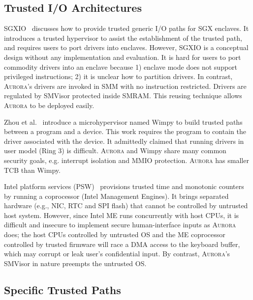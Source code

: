 \documentclass[journal,twocolumn,letterpaper,10pt]{IEEEtran}
\begin{document}
\subsection{Trusted I/O Architectures}

SGXIO~\cite{weiser_sgxio:_2017} discusses how to provide trusted generic I/O paths for SGX enclaves. It introduces a trusted hypervisor to assist the establishment of the trusted path, and requires users to port drivers into enclaves. However, SGXIO is a conceptual design without any implementation and evaluation. It is hard for users to port commodity drivers into an enclave because 1) enclave mode does not support privileged instructions; 2) it is unclear how to partition drivers. In contrast, \textsc{Aurora}'s drivers are invoked in SMM with no instruction restricted. Drivers are regulated by SMVisor protected inside SMRAM. This reusing technique allows \textsc{Aurora} to be deployed easily.

Zhou et al.~\cite{zhou_dancing_2014} introduce a microhypervisor named Wimpy to build trusted paths between a program  and a device. This work requires the program to contain the driver associated with the device. It admittedly claimed that running drivers in user model (Ring 3) is difficult. \textsc{Aurora} and Wimpy share many common security goals, e.g. interrupt isolation and MMIO protection. \textsc{Aurora} has smaller TCB than Wimpy. 

Intel platform services (PSW)~\cite{intel_psw} provisions trusted time and monotonic counters by running a coprocessor (Intel Management Engines). It brings separated hardware (e.g., NIC, RTC and SPI flash) that cannot be controlled by untrusted host system. However, since Intel ME runs concurrently with host CPUs, it is difficult and insecure to implement secure human-interface inputs as \textsc{Aurora} does; the host CPUs controlled by untrusted OS and the ME coprocessor controlled by trusted firmware will race a DMA access to the keyboard buffer, which may corrupt or leak user's confidential input. By contrast, \textsc{Aurora}'s SMVisor in nature preempts the untrusted OS.

\subsection{Specific Trusted Paths}
\end{document}
